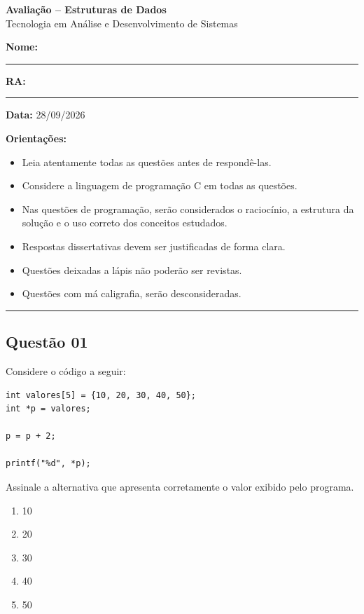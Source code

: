 \documentclass[12pt,a4paper]{article}
\begin{document}

\begin{center}
    {\Large \textbf{Avaliação -- Estruturas de Dados}}\\[0.2cm]
    {\large Tecnologia em Análise e Desenvolvimento de Sistemas}
\end{center}

\vspace{0.5cm}

\noindent
\textbf{Nome:} \rule{7cm}{0.4pt}
\hfill
\textbf{RA:} \rule{3cm}{0.4pt}
\hfill
\textbf{Data:} 28/09/2026

\vspace{0.5cm}

\textbf{Orientações:}

\begin{itemize}
    \item Leia atentamente todas as questões antes de respondê-las.
    \item Considere a linguagem de programação C em todas as questões.
    \item Nas questões de programação, serão considerados o raciocínio,
          a estrutura da solução e o uso correto dos conceitos estudados.
    \item Respostas dissertativas devem ser justificadas de forma clara.
    \item Questões deixadas a lápis não poderão ser revistas.
    \item Questões com má caligrafia, serão desconsideradas.
\end{itemize}
\rule{16.5cm}{0.4pt}
\hfill
\subsection*{Questão 01}

Considere o código a seguir:

\begin{lstlisting}
int valores[5] = {10, 20, 30, 40, 50};
int *p = valores;

p = p + 2;

printf("%d", *p);
\end{lstlisting}

Assinale a alternativa que apresenta corretamente o valor exibido pelo
programa.

\begin{enumerate}[label=\Alph*)]
    \item 10
    \item 20
    \item 30
    \item 40
    \item 50
\end{enumerate}
\end{document}
